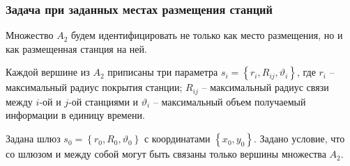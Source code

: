\begin{frame}
    \frametitle{Задача при заданных местах размещения станций}
    \fontsize{10pt}{7.2}\selectfont
    \justifying

    \bigskip


    Множество $A_2$ будем идентифицировать не только как место размещения, но и как размещенная станция на ней.
    
    \bigskip
    
    Каждой вершине из $A_2$ приписаны три параметра $s_i = \left\{ r_i, R_{ij},\vartheta_i \right\}$, где $r_i$ -- максимальный радиус покрытия станции; $R_{ij}$ -- максимальный радиус связи между $i$-ой и $j$-ой станциями и $\vartheta_i$ -- максимальный объем получаемый информации в единицу времени. 
    
    \bigskip
    
    Задана шлюз $s_0 = \left\{ r_0, R_0, \vartheta_0 \right\} $ с координатами $\left\{x_0, y_0 \right\}$. Задано условие, что со шлюзом и между собой могут быть связаны только вершины множества $A_2$.

\end{frame}


